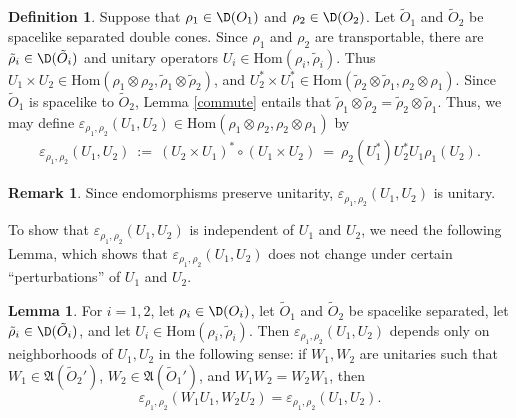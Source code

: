 \documentclass[12pt]{article}
\newcommand{\alg}[1]{\mathfrak{#1}}
\theoremstyle{definition}
\newtheorem{lemma}[thm]{Lemma}
\theoremstyle{definition}
\newtheorem{defn}[thm]{Definition}
\newtheorem{note}[thm]{Remark}
\theoremstyle{remark}
\newcommand{\ve}{\varepsilon}
\def\wt#1{{\tilde #1}}
\newcommand{\Hom}{\mathrm{Hom}}
\begin{document}
\begin{defn} Suppose that $\rho _1\in \D (O_1)$ and $\rho _2\in \D (O_2)$.  Let $\wt
  O_1$ and $\wt O_2$ be spacelike separated double cones.  Since $\rho _1$ and $\rho
  _2$ are transportable, there are $\wt \rho _i\in \D (\wt O_i)$ and unitary
  operators $U_i\in \Hom (\rho _i,\wt \rho _i)$.  Thus $U_1\times U_2 \in \Hom (\rho
  _1\otimes \rho _2 ,\wt\rho _1\otimes \wt\rho _2)$, and $U_2^*\times U_1^* \in \Hom
  (\wt\rho _2\otimes \wt\rho _1,\rho _2\otimes \rho _1)$.  Since $\wt O_1$ is
  spacelike to $\wt O_2$, Lemma \ref{commute} entails that $\wt\rho _1\otimes \wt\rho
  _2 =\wt\rho _2\otimes \wt\rho _1$.  Thus, we may define $\ve _{\rho _1,\rho
    _2}(U_1,U_2)\in \Hom (\rho _1\otimes \rho _2 ,\rho _2\otimes \rho _1 )$ by
  \begin{eqnarray}
    \ve _{\rho _1,\rho _2}(U_1,U_2) \: := \: (U_2\times U_1)^* \circ
    (U_1\times U_2) \: =\:  \rho _2 (U_1^*)U_2^*U_1\rho _1(U_2) .\label{def-braiding} \end{eqnarray}\end{defn}

\begin{note} Since endomorphisms preserve unitarity, $\ve _{\rho _1,\rho
    _2}(U_1,U_2)$ is unitary.
\end{note}

To show that $\ve _{\rho _1,\rho _2}(U_1,U_2)$ is independent of $U_1$ and $U_2$, we
need the following Lemma, which shows that $\ve _{\rho _1,\rho _2}(U_1,U_2)$ does not
change under certain ``perturbations'' of $U_1$ and $U_2$.

\begin{lemma} For $i=1,2$, let $\rho _i\in \D (O_i)$, let $\wt O_1$ and $\wt O_2$ be
  spacelike separated, let $\wt\rho _i\in \D (\wt O_i)$, and let $U_i\in \Hom (\rho
  _i,\wt\rho _i)$.  Then $\ve _{\rho _1,\rho _2}(U_1,U_2)$ depends only on
  neighborhoods of $U_1,U_2$ in the following sense: if $W_1,W_2$ are unitaries such
  that $W_1\in \alg{A}(\wt O_2')$, $W_2\in \alg{A}(\wt O_1')$, and $W_1W_2=W_2W_1$,
  then
$$ \ve _{\rho _1,\rho _2}(W_1U_1,W_2U_2)=\ve _{\rho _1,\rho _2}(U_1,U_2) .$$
\label{hunca-munca} \end{lemma}
\end{document}
